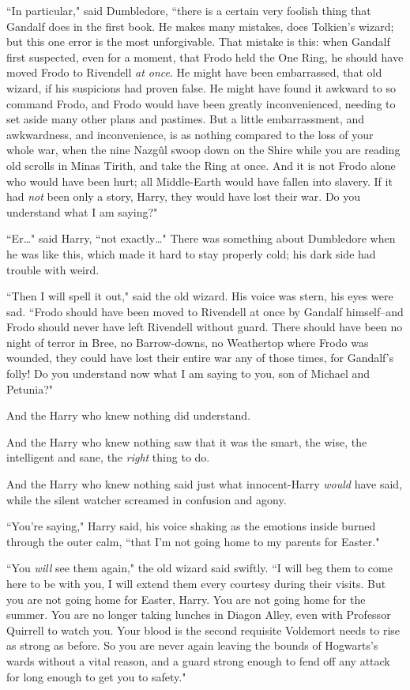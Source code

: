 ``In particular," said Dumbledore, ``there is a certain very foolish thing that Gandalf does in the first book. He makes many mistakes, does Tolkien's wizard; but this one error is the most unforgivable. That mistake is this: when Gandalf first suspected, even for a moment, that Frodo held the One Ring, he should have moved Frodo to Rivendell \emph{at once}. He might have been embarrassed, that old wizard, if his suspicions had proven false. He might have found it awkward to so command Frodo, and Frodo would have been greatly inconvenienced, needing to set aside many other plans and pastimes. But a little embarrassment, and awkwardness, and inconvenience, is as nothing compared to the loss of your whole war, when the nine Nazgûl swoop down on the Shire while you are reading old scrolls in Minas Tirith, and take the Ring at once. And it is not Frodo alone who would have been hurt; all Middle-Earth would have fallen into slavery. If it had \emph{not} been only a story, Harry, they would have lost their war. Do you understand what I am saying?"

``Er{\ldots}" said Harry, ``not exactly{\ldots}" There was something about Dumbledore when he was like this, which made it hard to stay properly cold; his dark side had trouble with weird.

``Then I will spell it out," said the old wizard. His voice was stern, his eyes were sad. ``Frodo should have been moved to Rivendell at once by Gandalf himself\---and Frodo should never have left Rivendell without guard. There should have been no night of terror in Bree, no Barrow-downs, no Weathertop where Frodo was wounded, they could have lost their entire war any of those times, for Gandalf's folly! Do you understand now what I am saying to you, son of Michael and Petunia?"

And the Harry who knew nothing did understand.

And the Harry who knew nothing saw that it was the smart, the wise, the intelligent and sane, the \emph{right} thing to do.

And the Harry who knew nothing said just what innocent-Harry \emph{would} have said, while the silent watcher screamed in confusion and agony.

``You're saying," Harry said, his voice shaking as the emotions inside burned through the outer calm, ``that I'm not going home to my parents for Easter."

``You \emph{will} see them again," the old wizard said swiftly. ``I will beg them to come here to be with you, I will extend them every courtesy during their visits. But you are not going home for Easter, Harry. You are not going home for the summer. You are no longer taking lunches in Diagon Alley, even with Professor Quirrell to watch you. Your blood is the second requisite Voldemort needs to rise as strong as before. So you are never again leaving the bounds of Hogwarts's wards without a vital reason, and a guard strong enough to fend off any attack for long enough to get you to safety."

